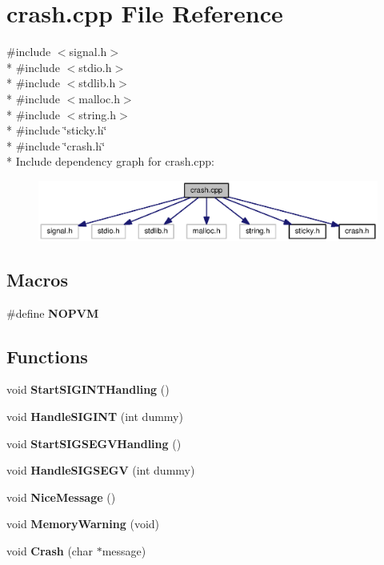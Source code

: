 \section{crash.\-cpp File Reference}
\label{crash_8cpp}
{\ttfamily \#include $<$signal.\-h$>$}\\*
{\ttfamily \#include $<$stdio.\-h$>$}\\*
{\ttfamily \#include $<$stdlib.\-h$>$}\\*
{\ttfamily \#include $<$malloc.\-h$>$}\\*
{\ttfamily \#include $<$string.\-h$>$}\\*
{\ttfamily \#include \char`\"{}sticky.\-h\char`\"{}}\\*
{\ttfamily \#include \char`\"{}crash.\-h\char`\"{}}\\*
Include dependency graph for crash.\-cpp\-:
\nopagebreak
\begin{figure}[H]
\begin{center}
\leavevmode
\includegraphics[width=350pt]{crash_8cpp__incl}
\end{center}
\end{figure}
\subsection*{Macros}
\begin{DoxyCompactItemize}
\item 
\#define {\bf N\-O\-P\-V\-M}
\end{DoxyCompactItemize}
\subsection*{Functions}
\begin{DoxyCompactItemize}
\item 
void {\bf Start\-S\-I\-G\-I\-N\-T\-Handling} ()
\item 
void {\bf Handle\-S\-I\-G\-I\-N\-T} (int dummy)
\item 
void {\bf Start\-S\-I\-G\-S\-E\-G\-V\-Handling} ()
\item 
void {\bf Handle\-S\-I\-G\-S\-E\-G\-V} (int dummy)
\item 
void {\bf Nice\-Message} ()
\item 
void {\bf Memory\-Warning} (void)
\item 
void {\bf Crash} (char $\ast$message)
\end{DoxyCompactItemize}


